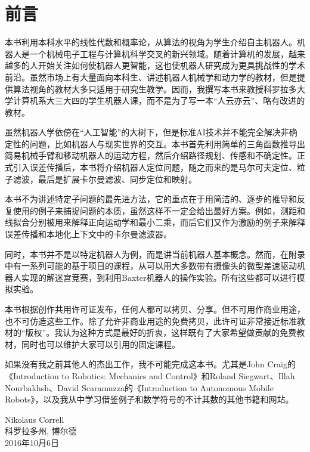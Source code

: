 \chapter*{前言}
本书利用本科水平的线性代数和概率论，从算法的视角为学生介绍自主机器人。机器人是一个机械电子工程与计算机科学交叉的新兴领域。随着计算机的发展，越来越多的人开始关注如何使机器人更智能，这也使机器人研究成为更具挑战性的学术前沿。虽然市场上有大量面向本科生、讲述机器人机械学和动力学的教材，但是提供算法视角的教材大多只适用于研究生教学。因而，我撰写本书来教授科罗拉多大学计算机系大三大四的学生机器人课，而不是为了写一本“人云亦云”、略有改进的教材。

虽然机器人学依傍在“人工智能”的大树下，但是标准AI技术并不能完全解决非确定性的问题，比如机器人与现实世界的交互。本书首先利用简单的三角函数推导出简易机械手臂和移动机器人的运动方程，然后介绍路径规划、传感和不确定性。正式引入误差传播后，本书将介绍机器人定位问题，随之而来的是马尔可夫定位、粒子滤波，最后是扩展卡尔曼滤波、同步定位和映射。

本书不为讲述特定子问题的最先进方法，它的重点在于用简洁的、逐步的推导和反复使用的例子来捕捉问题的本质，虽然这样不一定会给出最好方案。例如，测距和线拟合分别被用来解释正向运动学和最小二乘，而后它们又作为激励的例子来解释误差传播和本地化上下文中的卡尔曼滤波器。

同时，本书并不是以特定机器人为例，而是讲当前机器人基本概念。然而，在附录中有一系列可能的基于项目的课程，从可以用大多数带有摄像头的微型差速驱动机器人实现的解迷宫竞赛，到利用Baxter机器人的操作实验。所有这些都可以进行模拟实验。

本书根据创作共用许可证发布，任何人都可以拷贝、分享。但不可用作商业用途，也不可仿造这些工作。除了允许非商业用途的免费拷贝，此许可证非常接近标准教材的“版权”。我认为这种方式是最好的折衷，这样既有了大家希望做贡献的免费教材，同时也可以维护大家可以引用的固定课程。

如果没有我之前其他人的杰出工作，我不可能完成这本书。尤其是John Craig的《Introduction to Robotics: Mechanics and Control》和Roland Siegwart、Illah Nourbakhsh、David Scaramuzza的《Introduction to Autonomous Mobile Robots》，以及我从中学习借鉴例子和数学符号的不计其数的其他书籍和网站。



\begin{flushright}
Nikolaus Correll\\
科罗拉多州, 博尔德\\
2016年10月6日
\end{flushright}